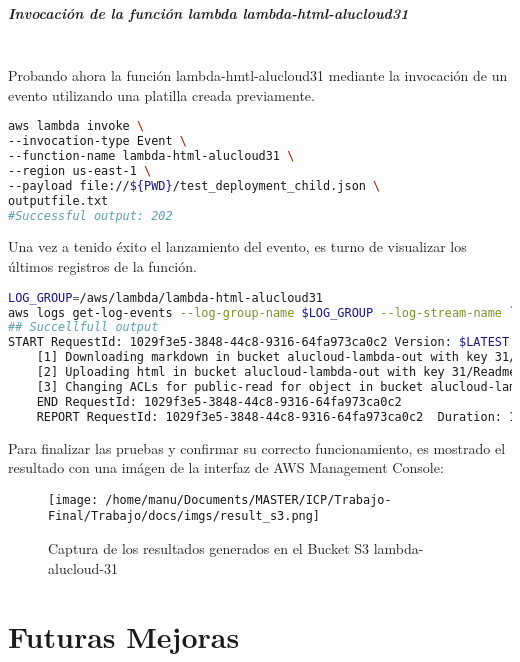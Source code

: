 \documentclass[
]{article}
\begin{document}
\hypertarget{header-n200}{%
\subparagraph{Invocación de la función lambda
lambda-html-alucloud31}\label{header-n200}}
\leavevmode
\\
Probando ahora la función lambda-hmtl-alucloud31 mediante la invocación de un evento utilizando una platilla creada previamente.
\begin{lstlisting}[language=bash,caption={Invocar evento}]
aws lambda invoke \
--invocation-type Event \
--function-name lambda-html-alucloud31 \
--region us-east-1 \
--payload file://${PWD}/test_deployment_child.json \
outputfile.txt
#Successful output: 202
\end{lstlisting}

Una vez a tenido éxito el lanzamiento del evento, es turno de visualizar
los últimos registros de la función.

\begin{lstlisting}[language=bash,caption={Logs de la función}]
LOG_GROUP=/aws/lambda/lambda-html-alucloud31
aws logs get-log-events --log-group-name $LOG_GROUP --log-stream-name `aws logs describe-log-streams --log-group-name $LOG_GROUP --max-items 1 --order-by LastEventTime --descending --query logStreams[].logStreamName --output text | head -n 1` --query events[].message --output text
## Succellfull output
START RequestId: 1029f3e5-3848-44c8-9316-64fa973ca0c2 Version: $LATEST
	[1] Downloading markdown in bucket alucloud-lambda-out with key 31/Readme.html
	[2] Uploading html in bucket alucloud-lambda-out with key 31/Readme.txt
	[3] Changing ACLs for public-read for object in bucket alucloud-lambda-out with key 31/Readme.txt
	END RequestId: 1029f3e5-3848-44c8-9316-64fa973ca0c2
	REPORT RequestId: 1029f3e5-3848-44c8-9316-64fa973ca0c2	Duration: 1462.16 ms	Billed Duration: 1463 ms	Memory Size: 128 MB	Max Memory Used: 78 MB	Init Duration: 477.93 ms	
\end{lstlisting}

Para finalizar las pruebas y confirmar su correcto funcionamiento, es
mostrado el resultado con una imágen de la interfaz de AWS Management
Console:

\begin{figure}[H]
\centering
\texttt{[image: /home/manu/Documents/MASTER/ICP/Trabajo-Final/Trabajo/docs/imgs/result\_s3.png]}
\caption{Captura de los resultados generados en el Bucket S3 lambda-alucloud-31}
\end{figure}
\newpage
\hypertarget{header-n206}{%
\section{Futuras Mejoras}\label{header-n206}}
\end{document}
